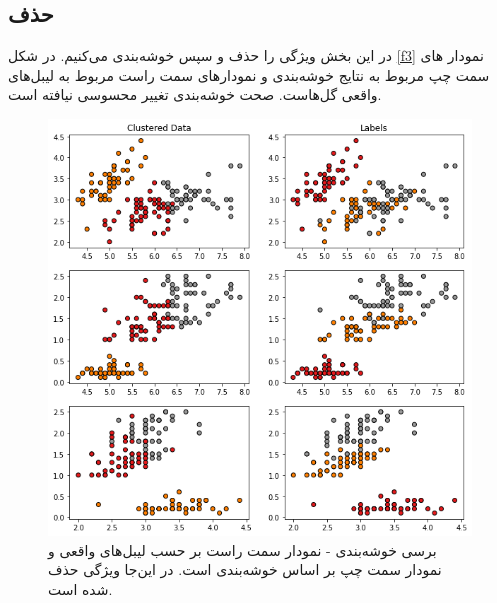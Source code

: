 \documentclass[a4paper]{article}
\begin{document}
\begin{large}
\subsection{حذف 
}
در این بخش ویژگی 
را حذف و سپس خوشه‌بندی می‌کنیم.
در شکل
\eqref{f3}
نمودار های سمت چپ مربوط به نتایج خوشه‌بندی و نمودار‌های سمت  راست مربوط به لیبل‌های واقعی گل‌هاست. صحت خوشه‌بندی تغییر محسوسی نیافته است.
\begin{figure}[h!]
	\centering
	\includegraphics[scale=0.6]{f3.png}
	\caption{برسی خوشه‌بندی - نمودار سمت راست بر حسب لیبل‌های واقعی و نمودار سمت چپ بر اساس خوشه‌بندی 
		است. در این‌جا ویژگی  
		حذف شده است.
	}
	\label{f3}
\end{figure}

\newpage

\end{large}
\end{document}
